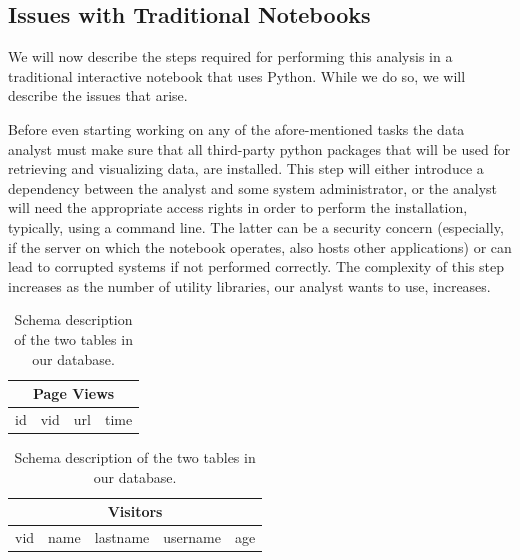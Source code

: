 \subsection{Issues with Traditional Notebooks}



We will now describe the steps required for performing this analysis in a traditional interactive notebook that uses Python. While we do so, we will describe the issues that arise.

 Before even starting working on any of the afore-mentioned tasks the data analyst must make sure that all third-party python packages that will be used for retrieving and visualizing data, are installed. This step will either introduce a dependency between the analyst and some system administrator, or the analyst will need the appropriate access rights in order to perform the installation, typically, using a command line. The latter can be a security concern (especially, if the server on which the notebook operates, also hosts other applications) or can lead to corrupted systems if not performed correctly. The complexity of this step increases as the number of utility libraries, our analyst wants to use, increases. 

\begin{table}
\begin{center}

\begin{tabular}{|c|c|c|c|}
\hline 
\multicolumn{4}{|c|}{Page Views} \\ 
\hline 
id & vid & url & time \\ 
\hline 
\end{tabular} 

\hfill

\begin{tabular}{|c|c|c|c|c|}
\hline 
\multicolumn{5}{|c|}{Visitors} \\ 
\hline 
vid & name & lastname & username & age \\ 
\hline 
\end{tabular} 

\end{center}
\caption{Schema description of the two tables in our database.}
\label{tab:schema}
\end{table}


